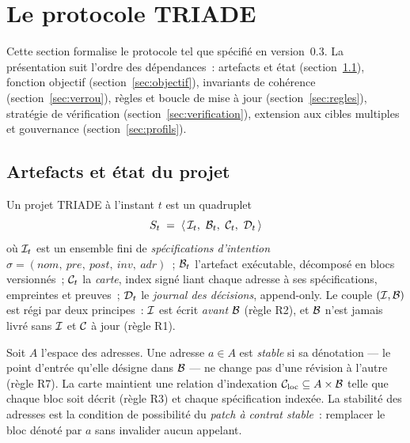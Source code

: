 \section{Le protocole TRIADE}\label{sec:methode}

Cette section formalise le protocole tel que spécifié en version~0.3. La
présentation suit l’ordre des dépendances~: artefacts et état
(section~\ref{sec:artefacts}), fonction objectif
(section~\ref{sec:objectif}), invariants de cohérence
(section~\ref{sec:verrou}), règles et boucle de mise à jour
(section~\ref{sec:regles}), stratégie de vérification
(section~\ref{sec:verification}), extension aux cibles multiples et
gouvernance (section~\ref{sec:profils}).

\subsection{Artefacts et état du projet}\label{sec:artefacts}

\begin{defn}\label{def:etat}
Un projet TRIADE à l’instant $t$ est un quadruplet
\begin{equation}\label{eq:etat}
S_t \;=\; \langle\, \mathcal{I}_t,\ \mathcal{B}_t,\ \mathcal{C}_t,\ \mathcal{D}_t \,\rangle
\end{equation}
où $\mathcal{I}_t$ est un ensemble fini de \emph{spécifications d’intention}
$\sigma = (\mathit{nom},\ \mathit{pre},\ \mathit{post},\ \mathit{inv},\
\mathit{adr})$~; $\mathcal{B}_t$ l’artefact exécutable, décomposé en blocs
versionnés~; $\mathcal{C}_t$ la \emph{carte}, index signé liant chaque adresse à ses
spécifications, empreintes et preuves~; $\mathcal{D}_t$ le \emph{journal des
décisions}, append-only. Le couple $(\mathcal{I}, \mathcal{B})$ est régi par deux
principes~: $\mathcal{I}$ est écrit \emph{avant} $\mathcal{B}$ (règle R2), et $\mathcal{B}$ n’est
jamais livré sans $\mathcal{I}$ et $\mathcal{C}$ à jour (règle R1).
\end{defn}

\begin{defn}\label{def:adresse}
Soit $A$ l’espace des adresses. Une adresse $a \in A$ est \emph{stable} si
sa dénotation — le point d’entrée qu’elle désigne dans $\mathcal{B}$ — ne change pas
d’une révision à l’autre (règle R7). La carte maintient une relation
d’indexation $\mathcal{C}_{\mathrm{loc}} \subseteq A \times \mathcal{B}$ telle que chaque
bloc soit décrit (règle R3) et chaque spécification indexée. La stabilité
des adresses est la condition de possibilité du \emph{patch à contrat
stable}~: remplacer le bloc dénoté par $a$ sans invalider aucun appelant.
\end{defn}

